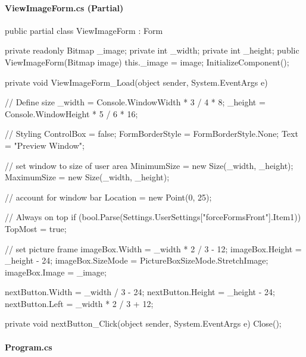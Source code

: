 \begin{flushleft}
    \paragraph{ViewImageForm.cs (Partial)}
    \begin{cscode}
public partial class ViewImageForm : Form
{
    private readonly Bitmap _image;
    private int _width;
    private int _height;
    public ViewImageForm(Bitmap image)
    {
        this._image = image;
        InitializeComponent();
    }

    private void ViewImageForm_Load(object sender, System.EventArgs e)
    {
        // Define size
        _width = Console.WindowWidth * 3 / 4 * 8;
        _height = Console.WindowHeight * 5 / 6 * 16;

        // Styling
        ControlBox = false;
        FormBorderStyle = FormBorderStyle.None;
        Text = "Preview Window";

        // set window to size of user area
        MinimumSize = new Size(_width, _height);
        MaximumSize = new Size(_width, _height);

        // account for window bar
        Location = new Point(0, 25);

        // Always on top
        if (bool.Parse(Settings.UserSettings["forceFormsFront"].Item1)) TopMost = true;

        // set picture frame
        imageBox.Width = _width * 2 / 3 - 12;
        imageBox.Height = _height - 24;
        imageBox.SizeMode = PictureBoxSizeMode.StretchImage;
        imageBox.Image = _image;

        nextButton.Width = _width / 3 - 24;
        nextButton.Height = _height - 24;
        nextButton.Left = _width * 2 / 3 + 12;
    }

    private void nextButton_Click(object sender, System.EventArgs e)
    {
        Close();
    }
}
    \end{cscode}
    
    
    \paragraph{Program.cs}
\end{flushleft}
